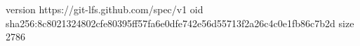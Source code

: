 version https://git-lfs.github.com/spec/v1
oid sha256:8c8021324802cfe80395ff57fa6e0dfe742e56d55713f2a26c4c0e1fb86c7b2d
size 2786
